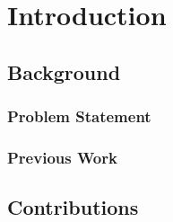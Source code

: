 \chapter{Introduction}

\section{Background}

\subsection{Problem Statement}

\subsection{Previous Work}

\section{Contributions}
